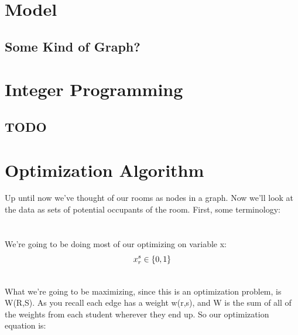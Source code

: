 \documentclass[12pt]{article}
\begin{document}
\begin{multicols}{2}
\section{Model}
\subsection{Some Kind of Graph?}

\section{Integer Programming}
\subsection{TODO}

\end{multicols}

\section{Optimization Algorithm}

Up until now we've thought of our rooms as nodes in a graph. Now we'll look at the data as sets of potential occupants of the room. First, some terminology:\\

\\
\\ 

\noindent We're going to be doing most of our optimizing on variable x:\\

\begin{equation*}
\noindent{x_r^s \in \{0, 1\}\\} 
\end{equation*}



\\

What we're going to be maximizing, since this is an optimization problem, is W(R,S). As you recall each edge has a weight w(r,s), and W is the sum of all of the weights from each student wherever they end up. So our optimization equation is:\\
\end{document}
